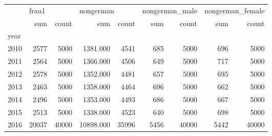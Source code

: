 \begin{tabular}{lrrrrrrrr}
\toprule
{} & \multicolumn{2}{l}{frau1} & \multicolumn{2}{l}{nongerman} & \multicolumn{2}{l}{nongerman\_male} & \multicolumn{2}{l}{nongerman\_female} \\
{} &    sum &  count &       sum &  count &            sum &  count &              sum &  count \\
year &        &        &           &        &                &        &                  &        \\
\midrule
2010 &   2577 &   5000 &  1381.000 &   4541 &            685 &   5000 &              696 &   5000 \\
2011 &   2564 &   5000 &  1366.000 &   4506 &            649 &   5000 &              717 &   5000 \\
2012 &   2578 &   5000 &  1352.000 &   4481 &            657 &   5000 &              695 &   5000 \\
2013 &   2463 &   5000 &  1358.000 &   4464 &            696 &   5000 &              662 &   5000 \\
2014 &   2496 &   5000 &  1353.000 &   4493 &            686 &   5000 &              667 &   5000 \\
2015 &   2513 &   5000 &  1338.000 &   4523 &            640 &   5000 &              698 &   5000 \\
2016 &  20037 &  40000 & 10898.000 &  35996 &           5456 &  40000 &             5442 &  40000 \\
\bottomrule
\end{tabular}
